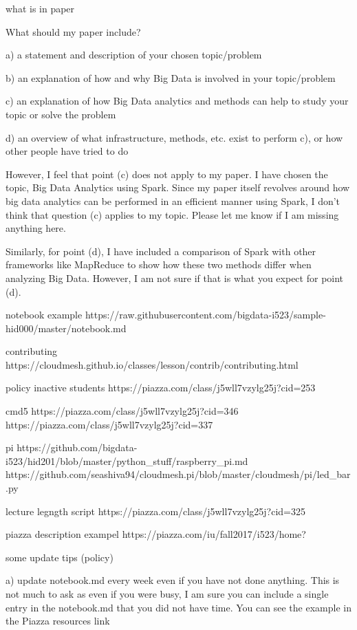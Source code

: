 what is in paper

What should my paper include?

a) a statement and description of your chosen topic/problem

b) an explanation of how and why Big Data is involved in your topic/problem

c) an explanation of how Big Data analytics and methods can help to study your topic or solve the problem

d) an overview of what infrastructure, methods, etc. exist to perform c), or how other people have tried to do 

 

However, I feel that point (c) does not apply to my paper. I have chosen the topic, Big Data Analytics using Spark. Since my paper itself revolves around how big data analytics can be performed in an efficient manner using Spark, I don't think that question (c) applies to my topic. Please let me know if I am missing anything here.

 

Similarly, for point (d), I have included a comparison of Spark with other frameworks like MapReduce to show how these two methods differ when analyzing Big Data. However, I am not sure if that is what you expect for point (d).

 

notebook example
https://raw.githubusercontent.com/bigdata-i523/sample-hid000/master/notebook.md


contributing
https://cloudmesh.github.io/classes/lesson/contrib/contributing.html

policy inactive students
https://piazza.com/class/j5wll7vzylg25j?cid=253

cmd5
https://piazza.com/class/j5wll7vzylg25j?cid=346
https://piazza.com/class/j5wll7vzylg25j?cid=337


pi
https://github.com/bigdata-i523/hid201/blob/master/python_stuff/raspberry_pi.md
https://github.com/seashiva94/cloudmesh.pi/blob/master/cloudmesh/pi/led_bar.py

lecture legngth script
https://piazza.com/class/j5wll7vzylg25j?cid=325


piazza description exampel
https://piazza.com/iu/fall2017/i523/home?


some update tips (policy)

a) update notebook.md every week even if you have not done anything. This is not much to ask as even if you were busy, I am sure you can include a single entry in the notebook.md that you did not have time. You can see the example in the Piazza resources link

